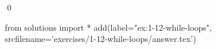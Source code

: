 
\begin{ex}
  \label{ex:1-12-while-loops}
  
  \qed
\end{ex}
\begin{python0}
from solutions import *
add(label="ex:1-12-while-loops",
    srcfilename='exercises/1-12-while-loops/answer.tex')
\end{python0}
